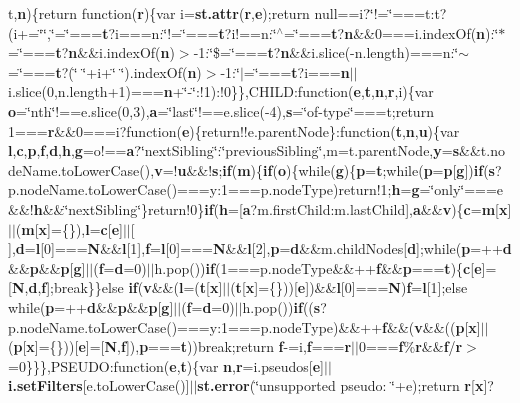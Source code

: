 {t},{\bf n})\{return function({\bf r})\{var i={\bf st.\-attr}({\bf r},{\bf e});return null==i?\char`\"{}!=\char`\"{}===t\-:t?(i+=\char`\"{}\char`\"{},\char`\"{}=\char`\"{}==={\bf t}?i===n\-:\char`\"{}!=\char`\"{}==={\bf t}?i!==n\-:\char`\"{}$^\wedge$=\char`\"{}==={\bf t}?{\bf n}\&\&0===i.\-index\-Of({\bf n})\-:\char`\"{}$\ast$=\char`\"{}==={\bf t}?{\bf n}\&\&i.\-index\-Of({\bf n})$>$-\/1\-:\char`\"{}\$=\char`\"{}==={\bf t}?{\bf n}\&\&i.\-slice(-\/n.\-length)===n\-:\char`\"{}$\sim$=\char`\"{}==={\bf t}?(\char`\"{} \char`\"{}+i+\char`\"{} \char`\"{}).index\-Of({\bf n})$>$-\/1\-:\char`\"{}$\vert$=\char`\"{}==={\bf t}?i==={\bf n}$\vert$$\vert$i.\-slice(0,n.\-length+1)==={\bf n}+\char`\"{}-\/\char`\"{}\-:!1)\-:!0\}\},C\-H\-I\-L\-D\-:function({\bf e},{\bf t},{\bf n},{\bf r},i)\{var {\bf o}=\char`\"{}nth\char`\"{}!==e.\-slice(0,3),{\bf a}=\char`\"{}last\char`\"{}!==e.\-slice(-\/4),{\bf s}=\char`\"{}of-\/type\char`\"{}===t;return 1==={\bf r}\&\&0===i?function({\bf e})\{return!!e.\-parent\-Node\}\-:function({\bf t},{\bf n},{\bf u})\{var {\bf l},{\bf c},{\bf p},{\bf f},{\bf d},{\bf h},{\bf g}=o!=={\bf a}?\char`\"{}next\-Sibling\char`\"{}\-:\char`\"{}previous\-Sibling\char`\"{},m=t.\-parent\-Node,{\bf y}={\bf s}\&\&t.\-node\-Name.\-to\-Lower\-Case(),{\bf v}=!{\bf u}\&\&!{\bf s};{\bf if}({\bf m})\{{\bf if}({\bf o})\{while({\bf g})\{{\bf p}={\bf t};while({\bf p}={\bf p}\mbox{[}{\bf g}\mbox{]}){\bf if}({\bf s}?p.\-node\-Name.\-to\-Lower\-Case()===y\-:1===p.\-node\-Type)return!1;{\bf h}={\bf g}=\char`\"{}only\char`\"{}===e\&\&!{\bf h}\&\&\char`\"{}next\-Sibling\char`\"{}\}return!0\}{\bf if}({\bf h}=\mbox{[}{\bf a}?m.\-first\-Child\-:m.\-last\-Child\mbox{]},{\bf a}\&\&{\bf v})\{{\bf c}={\bf m}\mbox{[}{\bf x}\mbox{]}$\vert$$\vert$({\bf m}\mbox{[}{\bf x}\mbox{]}=\{\}),{\bf l}={\bf c}\mbox{[}{\bf e}\mbox{]}$\vert$$\vert$\mbox{[}$\,$\mbox{]},{\bf d}={\bf l}\mbox{[}0\mbox{]}==={\bf N}\&\&{\bf l}\mbox{[}1\mbox{]},{\bf f}={\bf l}\mbox{[}0\mbox{]}==={\bf N}\&\&{\bf l}\mbox{[}2\mbox{]},{\bf p}={\bf d}\&\&m.\-child\-Nodes\mbox{[}{\bf d}\mbox{]};while({\bf p}=++{\bf d}\&\&{\bf p}\&\&{\bf p}\mbox{[}{\bf g}\mbox{]}$\vert$$\vert$({\bf f}={\bf d}=0)$\vert$$\vert$h.\-pop()){\bf if}(1===p.\-node\-Type\&\&++{\bf f}\&\&{\bf p}==={\bf t})\{{\bf c}\mbox{[}{\bf e}\mbox{]}=\mbox{[}{\bf N},{\bf d},{\bf f}\mbox{]};break\}\}else {\bf if}({\bf v}\&\&({\bf l}=({\bf t}\mbox{[}{\bf x}\mbox{]}$\vert$$\vert$({\bf t}\mbox{[}{\bf x}\mbox{]}=\{\}))\mbox{[}{\bf e}\mbox{]})\&\&{\bf l}\mbox{[}0\mbox{]}==={\bf N}){\bf f}={\bf l}\mbox{[}1\mbox{]};else while({\bf p}=++{\bf d}\&\&{\bf p}\&\&{\bf p}\mbox{[}{\bf g}\mbox{]}$\vert$$\vert$({\bf f}={\bf d}=0)$\vert$$\vert$h.\-pop()){\bf if}(({\bf s}?p.\-node\-Name.\-to\-Lower\-Case()===y\-:1===p.\-node\-Type)\&\&++{\bf f}\&\&({\bf v}\&\&(({\bf p}\mbox{[}{\bf x}\mbox{]}$\vert$$\vert$({\bf p}\mbox{[}{\bf x}\mbox{]}=\{\}))\mbox{[}{\bf e}\mbox{]}=\mbox{[}{\bf N},{\bf f}\mbox{]}),{\bf p}==={\bf t}))break;return {\bf f}-\/=i,{\bf f}==={\bf r}$\vert$$\vert$0==={\bf f}\%{\bf r}\&\&{\bf f}/{\bf r}$>$=0\}\}\},P\-S\-E\-U\-D\-O\-:function({\bf e},{\bf t})\{var {\bf n},{\bf r}=i.\-pseudos\mbox{[}{\bf e}\mbox{]}$\vert$$\vert${\bf i.\-set\-Filters}\mbox{[}e.\-to\-Lower\-Case()\mbox{]}$\vert$$\vert${\bf st.\-error}(\char`\"{}unsupported pseudo\-: \char`\"{}+e);return {\bf r}\mbox{[}{\bf x}\mbox{]}?{\bf }
